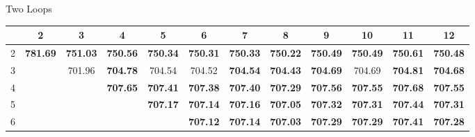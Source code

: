 \documentclass[hyphens,aspectratio=169]{beamer}
\begin{document}
\begin{frame}[fragile]{Two Loops}
	\begin{table}[H]
		\centering
		\begin{adjustbox}{max width=\textwidth,max height=2\textheight}
			\begin{tabular}{|c|c|c|c|c|c|c|c|c|c|c|c|}
				\hline
				                & 2               & 3               & 4               & 5               & 6               & 7               & 8               & 9               & 10              & 11              & 12              \\
				\hline
				2               & \textbf{781.69} & \textbf{751.03} & \textbf{750.56} &
				\textbf{750.34} & \textbf{750.31} & \textbf{750.33} &
				\textbf{750.22} & \textbf{750.49} & \textbf{750.49} &
				\textbf{750.61} & \textbf{750.48}                                                                                                                                                                                     \\
				\hline
				3               &                 & 701.96          & \textbf{704.78} & 704.54          & 704.52          & \textbf{704.54} & \textbf{704.43} & \textbf{704.69} & 704.69          & \textbf{704.81} & \textbf{704.68} \\
				\hline
				4               &                 &                 & \textbf{707.65} & \textbf{707.41} & \textbf{707.38} &
				\textbf{707.40} & \textbf{707.29} & \textbf{707.56} &
				\textbf{707.55} & \textbf{707.68} & \textbf{707.55}                                                                                                                                                                   \\
				\hline
				5               &                 &                 &                 & \textbf{707.17} & \textbf{707.14} & \textbf{707.16} &
				\textbf{707.05} & \textbf{707.32} & \textbf{707.31} &
				\textbf{707.44} & \textbf{707.31}                                                                                                                                                                                     \\
				\hline
				6               &                 &                 &                 &                 & \textbf{707.12} & \textbf{707.14} & \textbf{707.03}
				                & \textbf{707.29} & \textbf{707.29} & \textbf{707.41} & \textbf{707.28}                                                                                                                               \\

\end{tabular}
\end{adjustbox}
\end{table}
\end{frame}
\end{document}
